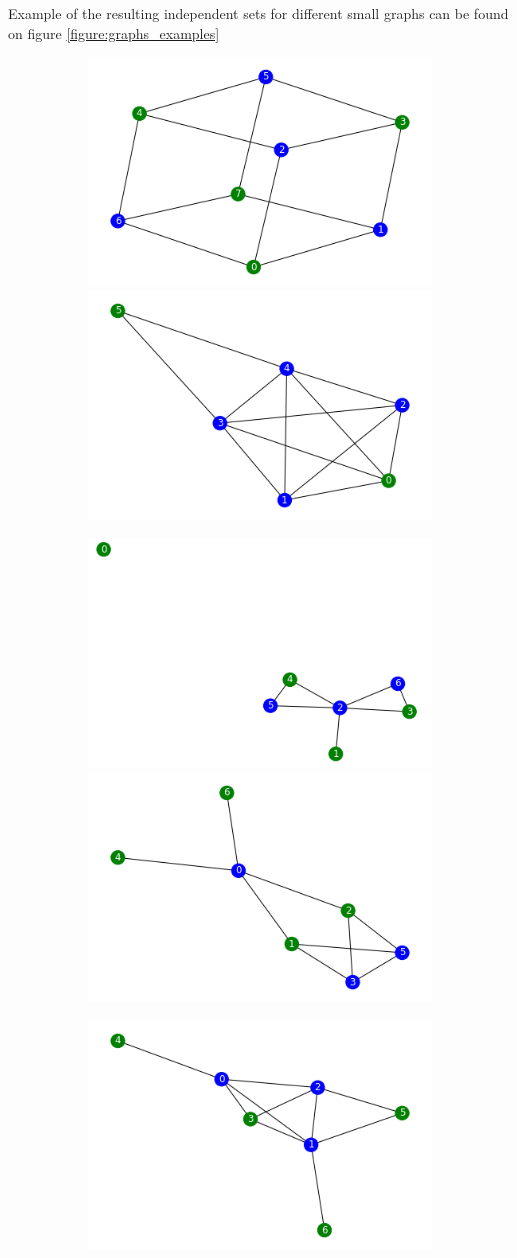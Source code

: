 Example of the resulting independent sets for different small graphs can be found on figure \ref{figure:graphs_examples}
\begin{figure}
    \centering
  \begin{subfigure}{\linewidth}
  \includegraphics[width=.4\linewidth]{figures/small_graphs/1.png}
  \includegraphics[width=.4\linewidth]{figures/small_graphs/2.png}
  \end{subfigure}\par\medskip
  \begin{subfigure}{\linewidth}
  \includegraphics[width=.4\linewidth]{figures/small_graphs/3.png}
  \includegraphics[width=.4\linewidth]{figures/small_graphs/4.png}
  \end{subfigure}\par\medskip
  \begin{subfigure}{\linewidth}
  \includegraphics[width=.4\linewidth]{figures/small_graphs/5.png}

\end{subfigure}
\end{figure}
